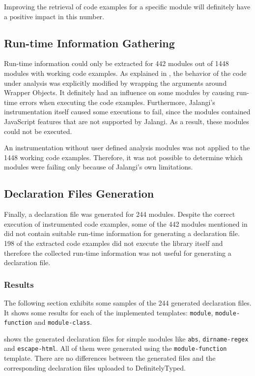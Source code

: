 Improving the retrieval of code examples for a specific module will definitely have a positive impact in this number.

\subsection{Run-time Information Gathering} \label{sec:experiments-run-time-information-gathering}
Run-time information could only be extracted for 442 modules out of 1448 modules with working code examples. As explained in , the behavior of the code under analysis was explicitly modified by wrapping the arguments around Wrapper Objects. It definitely had an influence on some modules by causing run-time errors when executing the code examples. Furthermore, Jalangi's instrumentation itself caused some executions to fail, since the modules contained JavaScript features that are not supported by Jalangi. As a result, these modules could not be executed.

An instrumentation without user defined analysis modules was not applied to the 1448 working code examples. Therefore, it was not possible to determine which modules were failing only because of Jalangi's own limitations.

\subsection{Declaration Files Generation} \label{sec:experiments-declaration-files-generation}
Finally, a declaration file was generated for 244 modules. Despite the correct execution of instrumented code examples, some of the 442 modules mentioned in  did not contain suitable run-time information for generating a declaration file. 198 of the extracted code examples did not execute the library itself and therefore the collected run-time information was not useful for generating a declaration file.

\subsubsection{Results}
The following section exhibits some samples of the 244 generated declaration files.  It shows some results for each of the implemented templates: \texttt{module}, \texttt{module-function} and \texttt{module-class}.

 shows the generated declaration files for simple modules like \texttt{abs}, \texttt{dirname-regex} and \texttt{escape-html}. All of them were generated using the \texttt{module-function} template. There are no differences between the generated files and the corresponding declaration files uploaded to DefinitelyTyped.

